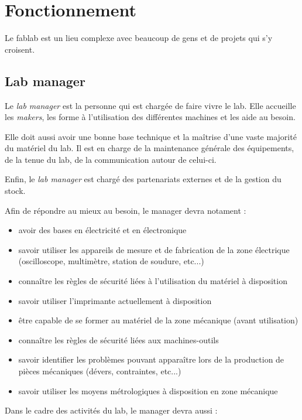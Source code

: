 \section{Fonctionnement}

Le fablab est un lieu complexe avec beaucoup de gens et de projets qui s'y croisent.

\subsection{Lab manager}

Le \textit{lab manager} est la personne qui est chargée de faire vivre le lab. Elle accueille les \textit{makers}, les forme à
l'utilisation des différentes machines et les aide au besoin.

Elle doit aussi avoir une bonne base technique et la maîtrise d'une vaste majorité du matériel du lab. Il est en
charge de la maintenance générale des équipements, de la tenue du lab, de la communication autour de celui-ci.

Enfin, le \textit{lab manager} est chargé des partenariats externes et de la gestion du stock.

Afin de répondre au mieux au besoin, le manager devra notament :

\begin{itemize}
	\item avoir des bases en électricité et en électronique
	\item savoir utiliser les appareils de mesure et de fabrication de la zone électrique (oscilloscope, multimètre, station de soudure, etc...)
	\item connaître les règles de sécurité liées à l'utilisation du matériel à disposition
	\item savoir utiliser l'imprimante actuellement à disposition
	\item être capable de se former au matériel de la zone mécanique (avant utilisation)
	\item connaître les règles de sécurité liées aux machines-outils
	\item savoir identifier les problèmes pouvant apparaître lors de la production de pièces mécaniques (dévers, contraintes, etc...)
	\item savoir utiliser les moyens métrologiques à disposition en zone mécanique
\end{itemize}

Dans le cadre des activités du lab, le manager devra aussi :


